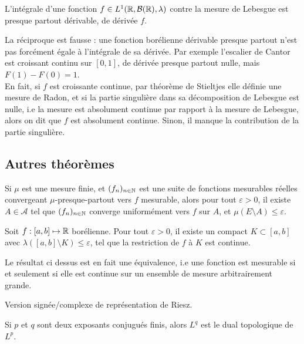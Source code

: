 \documentclass[11pt,a4paper]{article}
\begin{document}
\begin{corstar}
L'intégrale d'une fonction $f \in L^1(\mathbb R,\mathcal{B}(\mathbb R),\lambda)$ contre la mesure de Lebesgue est presque partout dérivable, de dérivée $f$.
\end{corstar}

\begin{rmq}
La réciproque est fausse : une fonction borélienne dérivable presque partout n'est pas forcément égale à l'intégrale de sa dérivée. Par exemple l'escalier de Cantor est croissant continu sur $[0,1]$, de dérivée presque partout nulle, mais $F(1)-F(0)=1$. \\
En fait, si $f$ est croissante continue, par théorème de Stieltjes elle définie une mesure de Radon, et si la partie singulière dans sa décomposition de Lebesgue est nulle, i.e la mesure est absolument continue par rapport à la mesure de Lebesgue, alors on dit que $f$ est absolument continue. Sinon, il manque la contribution de la partie singulière.
\end{rmq}


\subsection*{Autres théorèmes}
\begin{thmstar}
[Egorov] Si $\mu$ est une mesure finie, et $(f_n)_{n\in \mathbb N}$ est une suite de fonctions mesurables réelles convergeant $\mu$-presque-partout vers $f$ mesurable, alors pour tout $\varepsilon > 0$, il existe $A\in \mathcal{A}$ tel que $(f_n)_{n\in \mathbb N}$ converge uniformément vers $f$ sur $A$, et $\mu(E\setminus A) \leq \varepsilon $. 
\end{thmstar}

\begin{thmstar}
[Lusin] Soit $f : [a,b] \mapsto \mathbb R$ borélienne. Pour tout $\varepsilon>0$, il existe un compact $K\subset [a,b]$ avec $\lambda([a,b]\setminus K) \leq \varepsilon$, tel que la restriction de $f$ à $K$ est continue.
\end{thmstar}

\begin{rmq}
Le résultat ci dessus est en fait une équivalence, i.e une fonction est mesurable si et seulement si elle est continue sur un ensemble de mesure arbitrairement grande.
\end{rmq}

\begin{thmstar}

\end{thmstar}

\begin{rmq}
Version signée/complexe de représentation de Riesz.
\end{rmq}

\begin{thmstar}[Dualité]
Si $p$ et $q$ sont deux exposants conjugués finis, alors $L^q$ est le dual topologique de $L^p$.
\end{thmstar}
\end{document}
